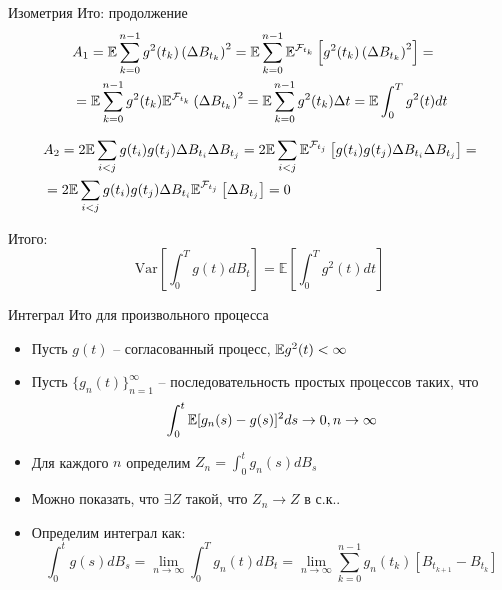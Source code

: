 \documentclass{beamer}
\begin{document}
\begin{frame}{Изометрия Ито: продолжение}
    \begin{align*}
        &A_1 = \mathbb{E} \sum_{k=0}^{n-1} g^2(t_k) \left(\Delta B_{t_k}\right)^2 = 
        \mathbb{E} \sum_{k=0}^{n-1} \mathbb{E}^{\mathcal{F}_{t_k}} \left[g^2(t_k) \left(\Delta B_{t_k}\right)^2 \right] 
        = \\ 
        & = \mathbb{E} \sum_{k=0}^{n-1} g^2(t_k) \mathbb{E}^{\mathcal{F}_{t_k}} \left(\Delta B_{t_k}\right)^2 = \mathbb{E} \sum_{k=0}^{n-1} g^2(t_k) \Delta t = \mathbb{E} \int_0^T g^2(t) dt 
    \end{align*}
     
    \begin{align*}
        &A_2 = 2 \mathbb{E} \sum_{i < j} g(t_i)g(t_j) \Delta B_{t_i} \Delta B_{t_j} =
        2 \mathbb{E} \sum_{i < j} \mathbb{E}^{\mathcal{F}_{t_j}} \left[g(t_i)g(t_j) \Delta B_{t_i} \Delta B_{t_j}\right] = \\
        &= 2 \mathbb{E} \sum_{i < j} g(t_i)g(t_j) \Delta B_{t_i} \mathbb{E}^{\mathcal{F}_{t_j}} \left[ \Delta B_{t_j}\right] = 0
    \end{align*}
     
    Итого:
    $$ \mathrm{Var} \left[ \int_0^T g(t) dB_t \right] = \mathbb{E} \left[\int_0^T g^2(t) dt\right]$$
\end{frame}


\begin{frame}{Интеграл Ито для произвольного процесса}
    \begin{itemize}
        \item Пусть $g(t)$ -- согласованный процесс, $\mathbb{E} g^2(t) < \infty$
        \item Пусть $\{g_n(t)\}_{n=1}^{\infty}$ -- последовательность простых процессов таких, что 
        $$
            \int_0^t \mathbb{E} [g_n(s)-g(s)]^2 ds \to 0, n \to \infty
        $$
        \item Для каждого $n$ определим $Z_n = \int_0^t g_n(s)dB_s$

        \item Можно показать, что $\exists Z$ такой, что $Z_n \to Z$ в с.к.. 
        
        \item Определим интеграл как:
        $$
            \int_0^t g(s)dB_s =  \lim_{n\to \infty}\int_0^T g_n(t) dB_t = \lim_{n \to \infty} \sum_{k=0}^{n-1} g_n(t_k)\left[B_{t_{k+1}} - B_{t_k}\right]
        $$
    \end{itemize}
\end{frame}
\end{document}

